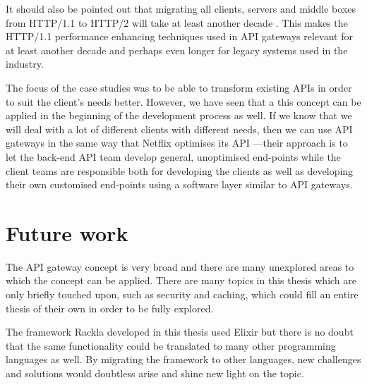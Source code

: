 \documentclass{cslthse-msc}
\begin{document}
It should also be pointed out that migrating all clients, servers and middle boxes from HTTP/1.1 to HTTP/2 will take at least another decade \cite{hpbn2}. This makes the HTTP/1.1 performance enhancing techniques used in API gateways relevant for at least another decade and perhaps even longer for legacy systems used in the industry.

The focus of the case studies was to be able to transform existing APIs in order to suit the client's needs better. However, we have seen that a this concept can be applied in the beginning of the development process as well. If we know that we will deal with a lot of different clients with different needs, then we can use API gateways in the same way that Netflix optimises its API \cite{netflix}---their approach is to let the back-end API team develop general, unoptimised end-points while the client teams are responsible both for developing the clients as well as developing their own customised end-points using a software layer similar to API gateways.

\section{Future work}

The API gateway concept is very broad and there are many unexplored areas to which the concept can be applied. There are many topics in this thesis which are only briefly touched upon, such as security and caching, which could fill an entire thesis of their own in order to be fully explored.

The framework Rackla developed in this thesis used Elixir but there is no doubt that the same functionality could be translated to many other programming languages as well. By migrating the framework to other languages, new challenges and solutions would doubtless arise and shine new light on the topic. 

\cleardoublepage
{}
{}


\end{document}
